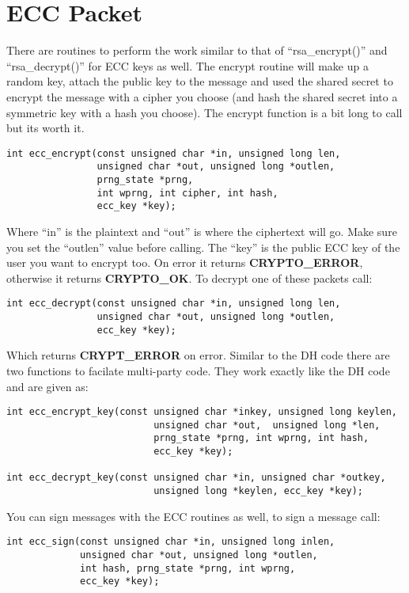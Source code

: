 \documentclass{book}
\begin{document}
\section{ECC Packet}
There are routines to perform the work similar to that of ``rsa\_encrypt()'' and ``rsa\_decrypt()'' for ECC keys as well.
The encrypt routine will make up a random key, attach the public key to the message and used the shared secret to encrypt
the message with a cipher you choose (and hash the shared secret into a symmetric key with a hash you choose).  The encrypt
function is a bit long to call but its worth it.
\begin{verbatim}
int ecc_encrypt(const unsigned char *in, unsigned long len, 
                unsigned char *out, unsigned long *outlen,
                prng_state *prng, 
                int wprng, int cipher, int hash, 
                ecc_key *key);
\end{verbatim}
Where ``in'' is the plaintext and ``out'' is where the ciphertext will go.  Make sure you set the ``outlen'' value before
calling.  The ``key'' is the public ECC key of the user you want to encrypt too.  On error it returns {\bf CRYPTO\_ERROR}, otherwise
it returns {\bf CRYPTO\_OK}.  To decrypt one of these packets call:
\begin{verbatim}
int ecc_decrypt(const unsigned char *in, unsigned long len, 
                unsigned char *out, unsigned long *outlen, 
                ecc_key *key);
\end{verbatim}
Which returns {\bf CRYPT\_ERROR} on error.  Similar to the DH code there are two functions to facilate multi-party code.
They work exactly like the DH code and are given as:
\begin{verbatim}
int ecc_encrypt_key(const unsigned char *inkey, unsigned long keylen,
                          unsigned char *out,  unsigned long *len, 
                          prng_state *prng, int wprng, int hash, 
                          ecc_key *key);

int ecc_decrypt_key(const unsigned char *in, unsigned char *outkey, 
                          unsigned long *keylen, ecc_key *key);
\end{verbatim}
You can sign messages with the ECC routines as well, to sign a message call:
\begin{verbatim}
int ecc_sign(const unsigned char *in, unsigned long inlen, 
             unsigned char *out, unsigned long *outlen, 
             int hash, prng_state *prng, int wprng, 
             ecc_key *key);
\end{verbatim}
\end{document}
